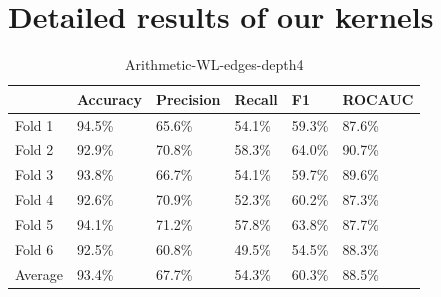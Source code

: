 \documentclass{IEEEtran}
\begin{document}



\appendix

\section{Detailed results of our kernels} \label{appendix:allresults}

\begin{table}[!ht]
    \centering
    \begin{tabular}{l||llll|l}
        \textbf{} & \textbf{Accuracy} & \textbf{Precision} & \textbf{Recall} & \textbf{F1} & \textbf{ROCAUC} \\
        \hline \hline
        Fold 1    & 94.5\%            & 65.6\%             & 54.1\%          & 59.3\%      & 87.6\%          \\
        Fold 2    & 92.9\%            & 70.8\%             & 58.3\%          & 64.0\%      & 90.7\%          \\
        Fold 3    & 93.8\%            & 66.7\%             & 54.1\%          & 59.7\%      & 89.6\%          \\
        Fold 4    & 92.6\%            & 70.9\%             & 52.3\%          & 60.2\%      & 87.3\%          \\
        Fold 5    & 94.1\%            & 71.2\%             & 57.8\%          & 63.8\%      & 87.7\%          \\
        Fold 6    & 92.5\%            & 60.8\%             & 49.5\%          & 54.5\%      & 88.3\%          \\
        \hline
        Average   & 93.4\%            & 67.7\%             & 54.3\%          & 60.3\%      & 88.5\%          \\
    \end{tabular}
    \caption{Arithmetic-WL-edges-depth4}
\end{table}
\end{document}
